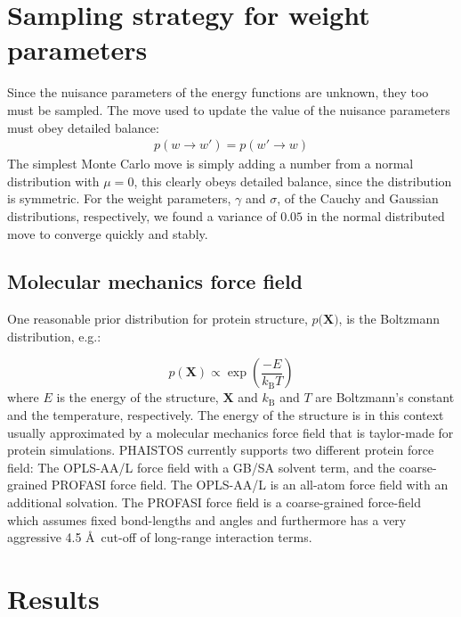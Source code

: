 \section{Sampling strategy for weight parameters}
Since the nuisance parameters of the energy functions are unknown, they too must be sampled.
The move used to update the value of the nuisance parameters must obey detailed balance:
\begin{eqnarray}
    p\left(w \rightarrow w'\right) = p\left(w' \rightarrow w\right)
\end{eqnarray}
The simplest Monte Carlo move is simply adding a number from a normal distribution with $\mu = 0$, this clearly obeys detailed balance, since the distribution is symmetric.
For the weight parameters, $\gamma$ and $\sigma$, of the Cauchy and Gaussian distributions, respectively, we found a variance of $0.05$ in the normal distributed move to converge quickly and stably.

\subsection{Molecular mechanics force field}

One reasonable prior distribution for protein structure, $p(\mathbf{X)}$, is the Boltzmann distribution, e.g.:

\begin{equation}
    p(\mathbf{X}) \propto \exp\left( \frac{-E}{k_\mathrm{B}T}\right)
\end{equation}
where $E$ is the energy of the structure, $\mathbf{X}$ and $k_\mathrm{B}$ and $T$ are Boltzmann's constant and the temperature, respectively.
The energy of the structure is in this context usually approximated by a molecular mechanics force field that is taylor-made for protein simulations. PHAISTOS currently supports two different protein force field: The OPLS-AA/L force field with a GB/SA solvent term, and the coarse-grained PROFASI force field. 
The OPLS-AA/L is an all-atom force field with an additional solvation. The PROFASI force field is a coarse-grained force-field which assumes fixed bond-lengths and angles and furthermore has a very aggressive 4.5 \AA~cut-off of long-range interaction terms.

\section{Results}



